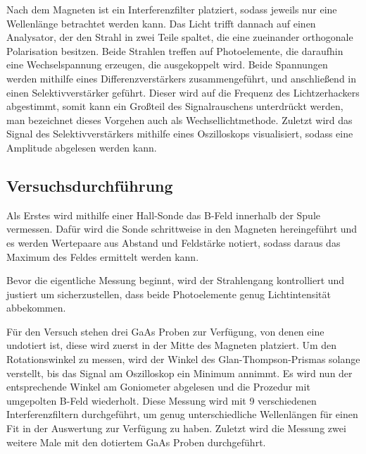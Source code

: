 Nach dem Magneten ist ein Interferenzfilter platziert, sodass jeweils nur eine Wellenlänge betrachtet werden kann. Das Licht trifft dannach auf
einen Analysator, der den Strahl in zwei Teile spaltet, die eine zueinander orthogonale Polarisation besitzen. Beide Strahlen treffen
auf Photoelemente, die daraufhin eine Wechselspannung erzeugen, die ausgekoppelt wird. Beide Spannungen werden mithilfe eines Differenzverstärkers
zusammengeführt, und anschließend in einen Selektivverstärker geführt. Dieser wird auf die Frequenz des Lichtzerhackers abgestimmt, somit kann ein
Großteil des Signalrauschens unterdrückt werden, man bezeichnet dieses Vorgehen auch als Wechsellichtmethode.
Zuletzt wird das Signal des Selektivverstärkers mithilfe eines Oszilloskops visualisiert, sodass eine Amplitude abgelesen werden kann.

\subsection{Versuchsdurchführung}

Als Erstes wird mithilfe einer Hall-Sonde das B-Feld innerhalb der Spule vermessen. Dafür wird die Sonde schrittweise in den Magneten hereingeführt
und es werden Wertepaare aus Abstand und Feldstärke notiert, sodass daraus das Maximum des Feldes ermittelt werden kann.

Bevor die eigentliche Messung beginnt, wird der Strahlengang kontrolliert und justiert um sicherzustellen, dass beide Photoelemente genug Lichtintensität
abbekommen.

Für den Versuch stehen drei GaAs Proben zur Verfügung, von denen eine undotiert ist, diese wird zuerst in der Mitte des Magneten platziert.
Um den Rotationswinkel zu messen, wird der Winkel des Glan-Thompson-Prismas
solange verstellt, bis das Signal am Oszilloskop ein Minimum annimmt. Es wird nun der entsprechende Winkel am Goniometer abgelesen und
die Prozedur mit umgepolten B-Feld wiederholt. Diese Messung wird mit 9 verschiedenen Interferenzfiltern durchgeführt, um genug unterschiedliche Wellenlängen für einen
Fit in der Auswertung zur Verfügung zu haben.
Zuletzt wird die Messung zwei weitere Male mit den dotiertem GaAs Proben durchgeführt.